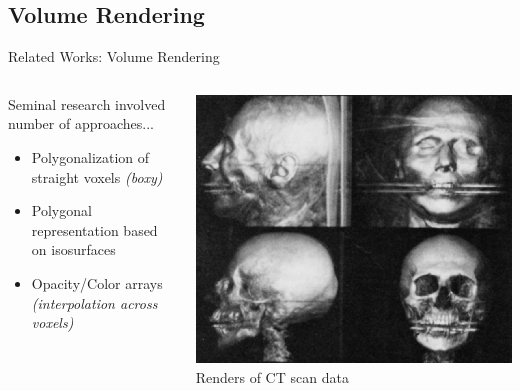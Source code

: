 \documentclass[10pt,handout,compress,professionalfont]{beamer}
\begin{document}
\subsection{Volume Rendering}
\begin{frame}{Related Works: Volume Rendering}

    \begin{columns}
        \begin{column}{0.6\textwidth}

    \vspace{-10mm}

    Seminal research involved number of approaches...
    
    \begin{itemize}
        \item Polygonalization of straight voxels \textit{(boxy)}\\
        \vspace{4mm}

        \item Polygonal representation based on isosurfaces\\
        \vspace{4mm}

        \item Opacity/Color arrays \textit{(interpolation across voxels)}\\
    \end{itemize}

        \end{column}
        \begin{column}{0.4\textwidth}
            \vspace{-4mm}
            \includegraphics[width=\textwidth]{../img/external/img188}\\
            {\centering\scriptsize Renders of CT scan data\\}
        \end{column}
    \end{columns}
\end{frame}
\end{document}
